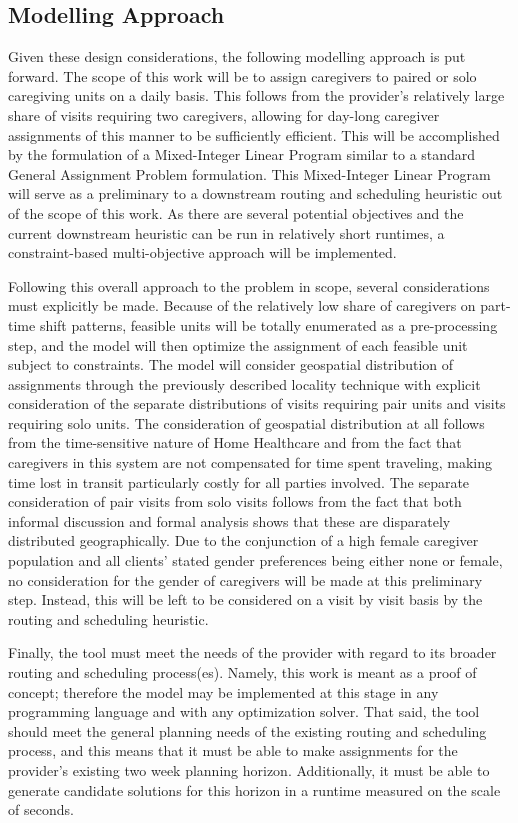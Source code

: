 \documentclass[11pt,twoside]{article}
\numberwithin{Theorem}{section}
\numberwithin{Definition}{section}
\numberwithin{Lemma}{section}
\numberwithin{Algorithm}{section}
\numberwithin{equation}{section}
\begin{document}
\subsection{Modelling Approach}
Given these design considerations, the following modelling approach is put forward. The scope of this work will be to assign caregivers to paired or solo caregiving units on a daily basis. This follows from the provider's relatively large share of visits requiring two caregivers, allowing for day-long caregiver assignments of this manner to be sufficiently efficient. This will be accomplished by the formulation of a Mixed-Integer Linear Program similar to a standard General Assignment Problem formulation. This Mixed-Integer Linear Program will serve as a preliminary to a downstream routing and scheduling heuristic out of the scope of this work. As there are several potential objectives and the current downstream heuristic can be run in relatively short runtimes, a constraint-based multi-objective approach will be implemented.

Following this overall approach to the problem in scope, several considerations must explicitly be made. Because of the relatively low share of caregivers on part-time shift patterns, feasible units will be totally enumerated as a pre-processing step, and the model will then optimize the assignment of each feasible unit subject to constraints. The model will consider geospatial distribution of assignments through the previously described locality technique with explicit consideration of the separate distributions of visits requiring pair units and visits requiring solo units. The consideration of geospatial distribution at all follows from the time-sensitive nature of Home Healthcare and from the fact that caregivers in this system are not compensated for time spent traveling, making time lost in transit particularly costly for all parties involved. The separate consideration of pair visits from solo visits follows from the fact that both informal discussion and formal analysis shows that these are disparately distributed geographically. Due to the conjunction of a high female caregiver population and all clients' stated gender preferences being either none or female, no consideration for the gender of caregivers will be made at this preliminary step. Instead, this will be left to be considered on a visit by visit basis by the routing and scheduling heuristic.

Finally, the tool must meet the needs of the provider with regard to its broader routing and scheduling process(es). Namely, this work is meant as a proof of concept; therefore the model may be implemented at this stage in any programming language and with any optimization solver. That said, the tool should meet the general planning needs of the existing routing and scheduling process, and this means that it must be able to make assignments for the provider's existing two week planning horizon. Additionally, it must be able to generate candidate solutions for this horizon in a runtime measured on the scale of seconds. 
\end{document}
